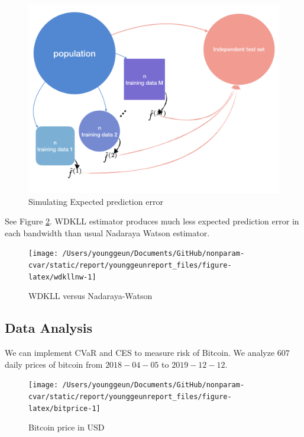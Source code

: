 \documentclass[
]{article}
\theoremstyle{definition}
\theoremstyle{definition}
\theoremstyle{definition}
\theoremstyle{remark}
\begin{document}
\begin{figure}[H]

{\centering \includegraphics[width=0.7\linewidth]{../docs/mc_epe} 

}

\caption{Simulating Expected prediction error}\label{fig:mctest}
\end{figure}

See Figure \ref{fig:wdkllnw}. WDKLL estimator produces much less expected prediction error in each bandwidth than usual Nadaraya Watson estimator.

\begin{figure}[H]

{\centering \texttt{[image: /Users/younggeun/Documents/GitHub/nonparam-cvar/static/report/younggeunreport\_files/figure-latex/wdkllnw-1]} 

}

\caption{WDKLL versus Nadaraya-Watson}\label{fig:wdkllnw}
\end{figure}

\hypertarget{data-analysis}{%
\subsection{Data Analysis}\label{data-analysis}}

We can implement CVaR and CES to measure risk of Bitcoin. We analyze \(607\) daily prices of bitcoin from \(2018-04-05\) to \(2019-12-12\).

\begin{figure}[H]

{\centering \texttt{[image: /Users/younggeun/Documents/GitHub/nonparam-cvar/static/report/younggeunreport\_files/figure-latex/bitprice-1]} 

}

\caption{Bitcoin price in USD}\label{fig:bitprice}
\end{figure}
\end{document}
